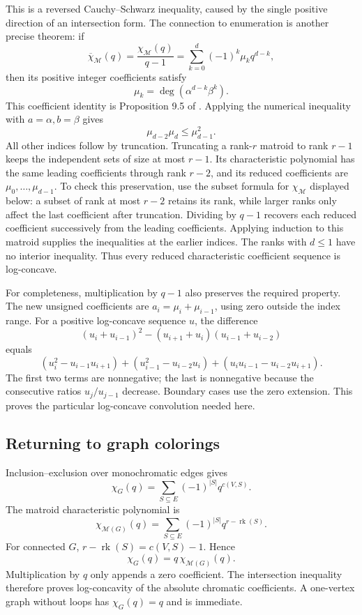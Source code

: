 \documentclass[11pt]{article}
\theoremstyle{definition}
\theoremstyle{remark}
\begin{document}
This is a reversed Cauchy--Schwarz inequality, caused by the single positive direction of an intersection form. The connection to enumeration is another precise theorem: if
\[
 \overline\chi_{\mathcal M}(q)
 =\frac{\chi_{\mathcal M}(q)}{q-1}
 =\sum_{k=0}^d(-1)^k\mu_kq^{d-k},
\]
then its positive integer coefficients satisfy
\begin{equation}\label{eq:gmh-coefficient-intersections}
 \mu_k=\deg(\alpha^{d-k}\beta^k).
\end{equation}
This coefficient identity is Proposition 9.5 of \cite{gmhAHK2018}. Applying the numerical inequality with $a=\alpha,b=\beta$ gives
\[
 \mu_{d-2}\mu_d\le\mu_{d-1}^2.
\]
All other indices follow by truncation. Truncating a rank-$r$ matroid to rank $r-1$ keeps the independent sets of size at most $r-1$. Its characteristic polynomial has the same leading coefficients through rank $r-2$, and its reduced coefficients are $\mu_0,\ldots,\mu_{d-1}$. To check this preservation, use the subset formula for $\chi_{\mathcal M}$ displayed below: a subset of rank at most $r-2$ retains its rank, while larger ranks only affect the last coefficient after truncation. Dividing by $q-1$ recovers each reduced coefficient successively from the leading coefficients. Applying induction to this matroid supplies the inequalities at the earlier indices. The ranks with $d\le1$ have no interior inequality. Thus every reduced characteristic coefficient sequence is log-concave.

For completeness, multiplication by $q-1$ also preserves the required property. The new unsigned coefficients are $a_i=\mu_i+\mu_{i-1}$, using zero outside the index range. For a positive log-concave sequence $u$, the difference
\[
 (u_i+u_{i-1})^2-(u_{i+1}+u_i)(u_{i-1}+u_{i-2})
\]
equals
\[
 (u_i^2-u_{i-1}u_{i+1})+
 (u_{i-1}^2-u_{i-2}u_i)+
 (u_iu_{i-1}-u_{i-2}u_{i+1}).
\]
The first two terms are nonnegative; the last is nonnegative because the consecutive ratios $u_j/u_{j-1}$ decrease. Boundary cases use the zero extension. This proves the particular log-concave convolution needed here.

\subsection{Returning to graph colorings}

Inclusion--exclusion over monochromatic edges gives
\[
 \chi_G(q)=\sum_{S\subseteq E}(-1)^{|S|}q^{c(V,S)}.
\]
The matroid characteristic polynomial is
\[
 \chi_{\mathcal M(G)}(q)=
 \sum_{S\subseteq E}(-1)^{|S|}q^{r-\operatorname{rk}(S)}.
\]
For connected $G$, $r-\operatorname{rk}(S)=c(V,S)-1$. Hence
\[
 \chi_G(q)=q\,\chi_{\mathcal M(G)}(q).
\]
Multiplication by $q$ only appends a zero coefficient. The intersection inequality therefore proves log-concavity of the absolute chromatic coefficients. A one-vertex graph without loops has $\chi_G(q)=q$ and is immediate.
\end{document}
